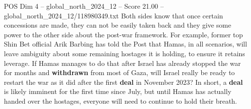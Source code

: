 \begin{textsample}{POS Dim 4 – global\_north\_2024\_12 – Score 21.00 – global\_north\_2024\_12/118980349.txt}
Both sides know that once certain concessions are made, they can not be easily taken back and they give some power to the other side about the post-war framework.
For example, former top Shin Bet official Arik Barbing has told the Post that Hamas, in all scenarios, will leave ambiguity about some remaining hostages it is holding, to ensure it retains leverage.
If Hamas manages to do that after Israel has already stopped the war for months and \textbf{withdrawn} from most of Gaza, will Israel really be ready to restart the war as it did after the first \textbf{deal} in November 2023?
In short, a \textbf{deal} is likely imminent for the first time since July, but until Hamas has actually handed over the hostages, everyone will need to continue to hold their breath.

\end{textsample}
